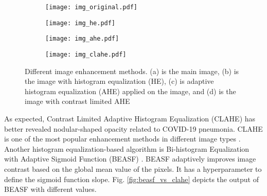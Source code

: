 \documentclass{article}
\begin{document}
\begin{figure}[H]
    \begin{subfigure}{0.24\linewidth}
        \centering
        \texttt{[image: img\_original.pdf]}
        \caption{}
        \label{fig:img_original}
    \end{subfigure}
    \hfill
    \begin{subfigure}{0.24\linewidth}
        \centering
        \texttt{[image: img\_he.pdf]}
        \caption{}
        \label{fig:img_he}
    \end{subfigure}
    \hfill
    \begin{subfigure}{0.24\linewidth}
        \centering
        \texttt{[image: img\_ahe.pdf]}
        \caption{}
        \label{fig:img_ahe}
    \end{subfigure}
    \hfill
    \begin{subfigure}{0.24\linewidth}
        \centering
        \texttt{[image: img\_clahe.pdf]}
        \caption{}
        \label{fig:img_clahe}
    \end{subfigure}

\caption{Different image enhancement methods. (a) is the main image, (b) is the image with histogram equalization (HE), (c) is adaptive histogram equalization (AHE) applied on the image, and (d) is the image with contrast limited AHE}
\label{fig:img_enhancements}
\end{figure}

\noindent As expected, Contrast Limited Adaptive Histogram Equalization (CLAHE) has better revealed nodular-shaped opacity related to COVID-19 pneumonia. CLAHE is one of the most popular enhancement methods in different image types \cite{pizer1987adaptive}. Another histogram equalization-based algorithm is Bi-histogram Equalization with Adaptive Sigmoid Function (BEASF) \cite{arriaga2014image}. BEASF adaptively improves image contrast based on the global mean value of the pixels. It has a hyperparameter  to define the sigmoid function slope. Fig. \ref{fig:beasf_vs_clahe} depicts the output of BEASF with different  values.
\end{document}
